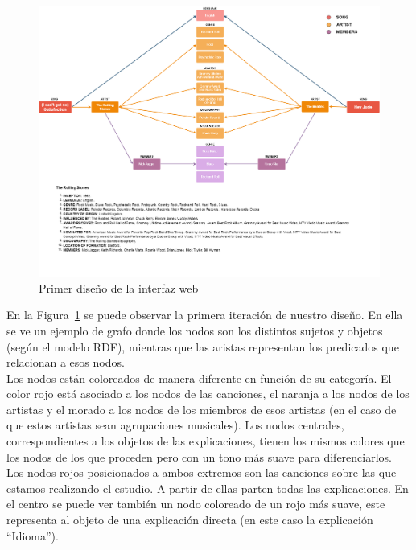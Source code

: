 \begin{figure}[h!]
	\centering
	\includegraphics[width = 1\textwidth]{Imagenes/Bitmap/InterfaceResult.png}
	\caption{Primer diseño de la interfaz web}
	\label{fig:primerDiseño}
\end{figure}

En la Figura~\ref{fig:primerDiseño} se puede observar la primera iteración de nuestro diseño. En ella se ve un ejemplo de grafo donde los nodos son los distintos sujetos y objetos (según el modelo RDF), mientras que las aristas representan los predicados que relacionan a esos nodos.\\

Los nodos están coloreados de manera diferente en función de su categoría. El color rojo está asociado a los nodos de las canciones, el naranja a los nodos de los artistas y el morado a los nodos de los miembros de esos artistas (en el caso de que estos artistas sean agrupaciones musicales). Los nodos centrales, correspondientes a los objetos de las explicaciones, tienen los mismos colores que los nodos de los que proceden pero con un tono más suave para diferenciarlos.\\

Los nodos rojos posicionados a ambos extremos son las canciones sobre las que estamos realizando el estudio. A partir de ellas parten todas las explicaciones. En el centro se puede ver también un nodo coloreado de un rojo más suave, este representa al objeto de una explicación directa (en este caso la explicación ``Idioma'').\\

